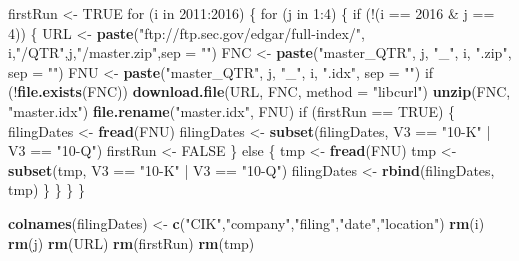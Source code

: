 \documentclass[english,man]{apa6}
\newenvironment{Shaded}{\begin{snugshade}}{\end{snugshade}}
\newcommand{\KeywordTok}[1]{\textcolor[rgb]{0.13,0.29,0.53}{\textbf{{#1}}}}
\newcommand{\DataTypeTok}[1]{\textcolor[rgb]{0.13,0.29,0.53}{{#1}}}
\newcommand{\DecValTok}[1]{\textcolor[rgb]{0.00,0.00,0.81}{{#1}}}
\newcommand{\StringTok}[1]{\textcolor[rgb]{0.31,0.60,0.02}{{#1}}}
\newcommand{\OtherTok}[1]{\textcolor[rgb]{0.56,0.35,0.01}{{#1}}}
\newcommand{\NormalTok}[1]{{#1}}
\begin{document}
\begin{Shaded}
\begin{Highlighting}[]
\NormalTok{firstRun <-}\StringTok{ }\OtherTok{TRUE}
\NormalTok{for (i in }\DecValTok{2011}\NormalTok{:}\DecValTok{2016}\NormalTok{) \{}
  \NormalTok{for (j in }\DecValTok{1}\NormalTok{:}\DecValTok{4}\NormalTok{) \{}
    \NormalTok{if (!(i ==}\StringTok{ }\DecValTok{2016} \NormalTok{&}\StringTok{ }\NormalTok{j ==}\StringTok{ }\DecValTok{4}\NormalTok{)) \{}
      \NormalTok{URL <-}\StringTok{ }\KeywordTok{paste}\NormalTok{(}\StringTok{"ftp://ftp.sec.gov/edgar/full-index/"}\NormalTok{, i,}\StringTok{"/QTR"}\NormalTok{,j,}\StringTok{"/master.zip"}\NormalTok{,}\DataTypeTok{sep =} \StringTok{""}\NormalTok{)}
      \NormalTok{FNC <-}\StringTok{ }\KeywordTok{paste}\NormalTok{(}\StringTok{"master_QTR"}\NormalTok{, j, }\StringTok{"_"}\NormalTok{, i, }\StringTok{".zip"}\NormalTok{, }\DataTypeTok{sep =} \StringTok{""}\NormalTok{)}
      \NormalTok{FNU <-}\StringTok{ }\KeywordTok{paste}\NormalTok{(}\StringTok{"master_QTR"}\NormalTok{, j, }\StringTok{"_"}\NormalTok{, i, }\StringTok{".idx"}\NormalTok{, }\DataTypeTok{sep =} \StringTok{""}\NormalTok{)}
      \NormalTok{if (!}\KeywordTok{file.exists}\NormalTok{(FNC))}
        \KeywordTok{download.file}\NormalTok{(URL, FNC, }\DataTypeTok{method =} \StringTok{"libcurl"}\NormalTok{)}
      \KeywordTok{unzip}\NormalTok{(FNC, }\StringTok{"master.idx"}\NormalTok{)}
      \KeywordTok{file.rename}\NormalTok{(}\StringTok{"master.idx"}\NormalTok{, FNU)}
      \NormalTok{if (firstRun ==}\StringTok{ }\OtherTok{TRUE}\NormalTok{) \{}
        \NormalTok{filingDates <-}\StringTok{ }\KeywordTok{fread}\NormalTok{(FNU)}
        \NormalTok{filingDates <-}\StringTok{ }\KeywordTok{subset}\NormalTok{(filingDates, V3 ==}\StringTok{ "10-K"} \NormalTok{|}\StringTok{ }\NormalTok{V3 ==}\StringTok{ "10-Q"}\NormalTok{)}
        \NormalTok{firstRun <-}\StringTok{ }\OtherTok{FALSE}
      \NormalTok{\} else \{}
        \NormalTok{tmp <-}\StringTok{ }\KeywordTok{fread}\NormalTok{(FNU)}
        \NormalTok{tmp <-}\StringTok{ }\KeywordTok{subset}\NormalTok{(tmp, V3 ==}\StringTok{ "10-K"} \NormalTok{|}\StringTok{ }\NormalTok{V3 ==}\StringTok{ "10-Q"}\NormalTok{)}
        \NormalTok{filingDates <-}\StringTok{ }\KeywordTok{rbind}\NormalTok{(filingDates, tmp)}
      \NormalTok{\}}
    \NormalTok{\}}
  \NormalTok{\}}
\NormalTok{\}}

\KeywordTok{colnames}\NormalTok{(filingDates) <-}\StringTok{ }\KeywordTok{c}\NormalTok{(}\StringTok{"CIK"}\NormalTok{,}\StringTok{"company"}\NormalTok{,}\StringTok{"filing"}\NormalTok{,}\StringTok{"date"}\NormalTok{,}\StringTok{"location"}\NormalTok{)}
\KeywordTok{rm}\NormalTok{(i)}
\KeywordTok{rm}\NormalTok{(j)}
\KeywordTok{rm}\NormalTok{(URL)}
\KeywordTok{rm}\NormalTok{(firstRun)}
\KeywordTok{rm}\NormalTok{(tmp)}


\end{Highlighting}
\end{Shaded}
\end{document}
